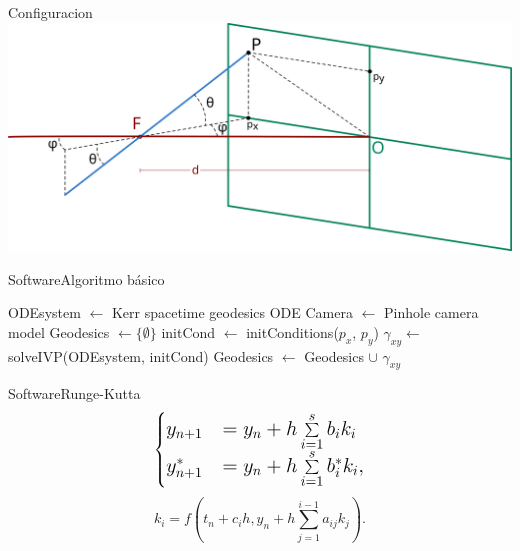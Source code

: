 {
	\begin{frame}[plain]{Configuracion}
		\centering
		\includegraphics[width=0.8\paperwidth]{gfx/pinhole}
	\end{frame}
}




\begin{frame}{Software}{Algoritmo básico}
	{
	\tiny
	\begin{algorithm}[H]
		\begin{algorithmic}[1]
			\State ODEsystem $\gets$ Kerr spacetime geodesics ODE
			\State Camera $\gets$ Pinhole camera model
			\State Geodesics $\gets \{\emptyset\}$
			\State initCond $\gets$ initConditions($p_x$, $p_y$)
			\State $\gamma_{xy} \gets$ solveIVP(ODEsystem, initCond)
			\State Geodesics $\gets$ Geodesics $\cup$ $\gamma_{xy}$
			\EndFor
			\EndFunction
		\end{algorithmic}
	\end{algorithm}
	}
\end{frame}

\begin{frame}{Software}{Runge-Kutta}
	\[
	\Large
	\begin{cases}
		y_{n+1} &= y_n + h \sum\limits_{i=1}^s b_i k_i\\
		y^*_{n+1} &= y_n + h \sum\limits_{i=1}^s b^*_i k_i,
	\end{cases}
	\]
	\vspace{2mm}
	\[
		k_i = f(t_n + c_ih, y_n + h\sum_{j=1}^{i-1} a_{ij} k_j).
	\]
	
\end{frame}

